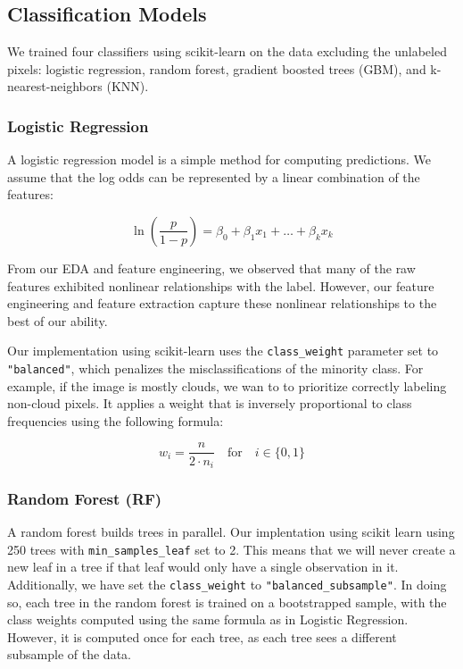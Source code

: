 \documentclass[11pt,letterpaper]{article}
\begin{document}
\subsection{Classification Models}

We trained four classifiers using scikit-learn on the data excluding the unlabeled pixels: logistic regression, random forest, gradient boosted trees (GBM), and k-nearest-neighbors (KNN).

\subsubsection{Logistic Regression}

A logistic regression model is a simple method for computing predictions. We assume that the log odds can be represented by a linear combination of the features:

$$
\ln\left(\frac{p}{1-p}\right)=\beta_0+\beta_1x_1 + \dots + \beta_kx_k
$$

From our EDA and feature engineering, we observed that many of the raw features exhibited nonlinear relationships with the label. However, our feature engineering and feature extraction capture these nonlinear relationships to the best of our ability.

Our implementation using scikit-learn uses the \texttt{class\_weight} parameter set to \texttt{"balanced"}, which penalizes the misclassifications of the minority class. For example, if the image is mostly clouds, we wan to to prioritize correctly labeling non-cloud pixels. It applies a weight that is inversely proportional to class frequencies using the following formula:

$$
    w_i = \frac{n}{2\cdot n_i} \quad \text{for} \quad i\in \{0, 1\}
$$

\subsubsection{Random Forest (RF)}

A random forest builds trees in parallel. Our implentation using scikit learn using 250 trees with \texttt{min\_samples\_leaf} set to 2. This means that we will never create a new leaf in a tree if that leaf would only have a single observation in it. Additionally, we have set the \texttt{class\_weight} to \texttt{"balanced\_subsample"}. In doing so, each tree in the random forest is trained on a bootstrapped sample, with the class weights computed using the same formula as in Logistic Regression. However, it is computed once for each tree, as each tree sees a different subsample of the data.
\end{document}
